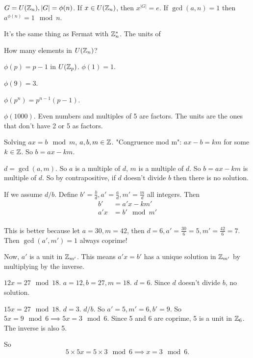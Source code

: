 \documentclass[class=article,crop=false]{standalone}
\begin{document}
\begin{thm}
	$ G=U(\mathbb{Z}_n), |G|=\phi(n)$. If $ x \in U(\mathbb{Z}_n)$, then $ x^{|G|}=e$. If $ \gcd ( a,n)=1 $ then $ a^{\phi(n)}=1 \mod n$.
\end{thm}
\begin{note}[]
It's the same thing as Fermat with $ \mathbb{Z}_n^* $. The units of 
\end{note}

How many elements in $ U(\mathbb{Z}_n)$?

\begin{defn}
	$ \phi(p) = p-1$ in $ U(\mathbb{Z}_p)$. $ \phi(1)=1$.
\end{defn}

\begin{eg}[]
	$ \phi(9) =3$.  
\end{eg}
\begin{prop}[]
	$ \phi(p^{n}) = p^{n-1}(p-1)$. 
\end{prop}
\begin{eg}[]
	$ \phi(1000)$. Even numbers and multiples of 5 are factors. The units are the ones that don't have 2 or 5 as factors.
\end{eg}
\begin{eg}
Solving $ ax=b \mod m$, $ a,b,m \in \mathbb{Z}$. "Congruence mod m": $ ax-b = km$ for some  $ k \in \mathbb{Z}$. So $ b=ax-km$.

$ d=\gcd ( a,m) $. So $ a$ is a multiple of  $ d$,  $ m$ is a multiple of  $ d$. So  $ b= ax-km$ is multiple of $ d$. So by contrapositive, if $ d $ doesn't divide  $ b$ then there is no solution. 

If we assume $ d / b$. Define  $ b' = \frac{b}{d}, a'=\frac{a}{d}, m'=\frac{m}{d}$ all integers. Then
\begin{align*}
	b'&=a'x-km'\\
	a'x &= b' \mod m'\\
\end{align*}

This is better because let $ a=30, m=42$, then  $ d=6, a'=\frac{30}{6}=5, m'=\frac{42}{6}=7$. Then $ \gcd ( a',m')=1 $ always coprime! 

Now, $ a'$ is a unit in  $ \mathbb{Z}_{m'}$. This means $ a'x=b'$ has a unique solution in  $ \mathbb{Z}_{m'}$ by multiplying by the inverse.
\end{eg}

\begin{eg}[20.14]
$ 12x=27 \mod 18$. $ a=12, b=27,m=18$.  $ d=6$. Since  $ d$ doesn't divide  $ b$, no solution.

$ 15x=27 \mod 18$. $ d=3$. $ d / b$. So  $ a'=5, m'=6, b'= 9$. So  $ 5x=9 \mod 6 \implies 5x=3 \mod 6$. Since 5 and 6 are coprime, 5 is a unit in $ \mathbb{Z}_6$. The inverse is also 5. 

So \[
5 \times 5 x = 5 \times 3 \mod 6 \implies x = 3 \mod 6
.\]

\end{eg}
\end{document}

